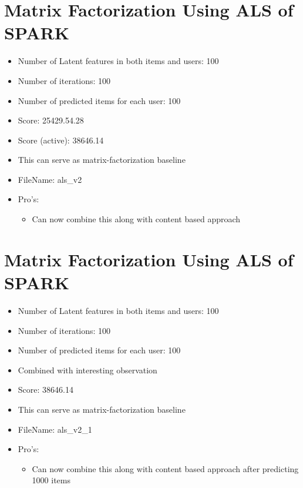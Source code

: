 \documentclass{article}
\begin{document}
\section{Matrix Factorization Using ALS of SPARK}
\begin{itemize}
 \item Number of Latent features in both items and users: 100
 \item Number of iterations: 100
 \item Number of predicted items for each user: 100
 \item Score:  25429.54.28
 \item Score (active): 38646.14
 \item This can serve as matrix-factorization baseline
 \item FileName: als\_v2
 \item Pro's:
 \begin{itemize}
 \item Can now combine this along with content based approach
 \end{itemize}
 
\end{itemize}

\section{Matrix Factorization Using ALS of SPARK}

\begin{itemize}
 \item Number of Latent features in both items and users: 100
 \item Number of iterations: 100
 \item Number of predicted items for each user: 100
 \item Combined with interesting observation
 \item Score:  38646.14
 \item This can serve as matrix-factorization baseline
 \item FileName: als\_v2\_1
 \item Pro's:
 \begin{itemize}
 \item Can now combine this along with content based approach after predicting 1000 items
 \end{itemize}
 
\end{itemize}
\end{document}
